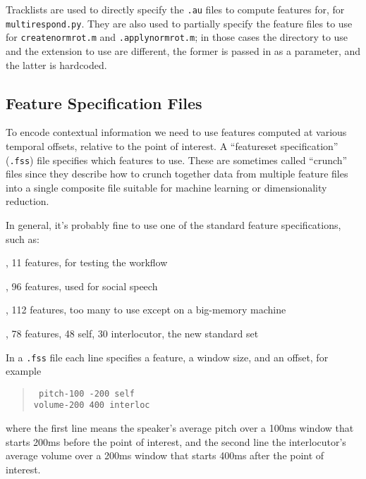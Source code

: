 \documentclass[11pt]{article}
\begin{document}
Tracklists are used to directly specify the {\tt .au} files to compute
features for, for {\tt multirespond.py}.  They are also used to
partially specify the feature files to use for {\tt createnormrot.m}
and {\tt .applynormrot.m}; in those cases the directory to use and the
extension to use are different, the former is passed in as
a parameter, and the latter is hardcoded.


\subsection{Feature Specification Files}     \label{featurespec-files}

To encode contextual information we need to use features computed at
various temporal offsets, relative to the point of interest.  A
``featureset specification'' ({\tt .fss}) file specifies which
features to use.  These are sometimes called ``crunch'' files since
they describe how to crunch together data from multiple feature files
into a single composite file suitable for machine learning or
dimensionality reduction.  

In general, it's probably fine to use one of the standard feature
specifications, such as:
\begin{description}  \setlength{\itemsep}{0pt}\setlength{\parskip}{0pt}
\item[minitest/minicrunch.fss], 11 features, for testing the workflow
\item[social/symmetric.fss], 96 features, used for social speech
\item[fulltest/fullcrunch.fss], 112 features, too many to use except on a big-memory machine
\item[fulltest/slim.fss], 78 features, 48 self, 30 interlocutor, the new standard set 
\end{description}

In a {\tt .fss} file each line specifies a feature, a window size, and
an offset, for example

\begin{quote}{\tt 
    pitch-100 -200 self  \\
    volume-200 400 interloc
}\end{quote}

where the first line means the speaker's average pitch over a 100ms
window that starts 200ms before the point of interest, and the second
line the interlocutor's average volume over a 200ms window that starts
400ms after the point of interest.
\end{document}
